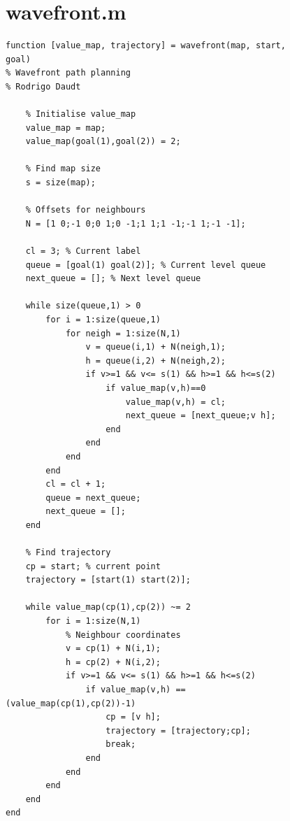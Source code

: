 \documentclass[journal]{IEEEtran}
\begin{document}
\begin{figure}
\section{wavefront.m}\label{wavem}
    \begin{verbatim}
function [value_map, trajectory] = wavefront(map, start, goal)
% Wavefront path planning
% Rodrigo Daudt

    % Initialise value_map
    value_map = map;
    value_map(goal(1),goal(2)) = 2;

    % Find map size
    s = size(map);

    % Offsets for neighbours
    N = [1 0;-1 0;0 1;0 -1;1 1;1 -1;-1 1;-1 -1];

    cl = 3; % Current label
    queue = [goal(1) goal(2)]; % Current level queue
    next_queue = []; % Next level queue

    while size(queue,1) > 0
        for i = 1:size(queue,1)
            for neigh = 1:size(N,1)
                v = queue(i,1) + N(neigh,1);
                h = queue(i,2) + N(neigh,2);
                if v>=1 && v<= s(1) && h>=1 && h<=s(2)
                    if value_map(v,h)==0
                        value_map(v,h) = cl;
                        next_queue = [next_queue;v h];
                    end
                end
            end
        end
        cl = cl + 1;
        queue = next_queue;
        next_queue = [];
    end

    % Find trajectory
    cp = start; % current point
    trajectory = [start(1) start(2)];

    while value_map(cp(1),cp(2)) ~= 2
        for i = 1:size(N,1)
            % Neighbour coordinates
            v = cp(1) + N(i,1);
            h = cp(2) + N(i,2);
            if v>=1 && v<= s(1) && h>=1 && h<=s(2)
                if value_map(v,h) == (value_map(cp(1),cp(2))-1)
                    cp = [v h];
                    trajectory = [trajectory;cp];
                    break;
                end
            end
        end
    end
end
\end{verbatim}
\end{figure}




%
%
\end{document}
